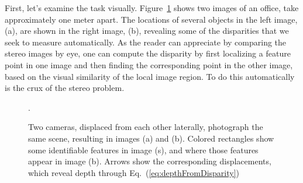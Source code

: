 First, let's examine the task visually.   Figure~\ref{fig:stereomatch} shows two images of an office, take approximately one meter apart.  The locations of several objects in the left image, (a), are shown in the right image, (b), revealing some of the disparities that we seek to measure automatically.  As the reader can appreciate by comparing the stereo images by eye, one can compute the disparity by first localizing a feature point in one image and then finding the corresponding point in the other image, based on the visual similarity of the local image region.  To do this automatically is the crux of the stereo problem.


\begin{figure}
\centerline{
}
\caption{Two cameras, displaced from each other laterally, photograph the same scene, resulting in images (a) and (b).  Colored rectangles show some identifiable features in image (s), and where those features appear in image (b).  Arrows show the corresponding displacements, which reveal depth through Eq.~(\ref{eq:depthFromDisparity})}.
\label{fig:stereomatch}
\end{figure}


